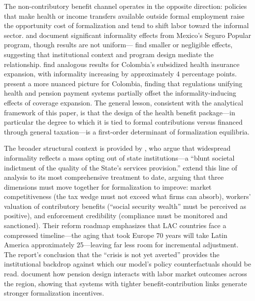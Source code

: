 \documentclass[12pt,a4paper]{article}
\begin{document}
The non-contributory benefit channel operates in the opposite direction: policies that make health or income transfers available outside formal employment raise the opportunity cost of formalization and tend to shift labor toward the informal sector. \citet{BoschCampos2014} and \citet{AteridoEtAl2011} document significant informality effects from Mexico's Seguro Popular program, though results are not uniform---\citet{AzuaraMarinescu2013} find smaller or negligible effects, suggesting that institutional context and program design mediate the relationship. \citet{CamachoConoverHoyos2013} find analogous results for Colombia's subsidized health insurance expansion, with informality increasing by approximately 4 percentage points. \citet{CalderonMarinescu2012} present a more nuanced picture for Colombia, finding that regulations unifying health and pension payment systems partially offset the informality-inducing effects of coverage expansion. The general lesson, consistent with the analytical framework of this paper, is that the design of the health benefit package---in particular the degree to which it is tied to formal contributions versus financed through general taxation---is a first-order determinant of formalization equilibria.

The broader structural context is provided by \citet{PerryEtAl2007}, who argue that widespread informality reflects a mass opting out of state institutions---a ``blunt societal indictment of the quality of the State's services provision.'' \citet{WorldBankInformalizing2025} extend this line of analysis to its most comprehensive treatment to date, arguing that three dimensions must move together for formalization to improve: market competitiveness (the tax wedge must not exceed what firms can absorb), workers' valuation of contributory benefits (``social security wealth'' must be perceived as positive), and enforcement credibility (compliance must be monitored and sanctioned). Their reform roadmap emphasizes that LAC countries face a compressed timeline---the aging that took Europe 70 years will take Latin America approximately 25---leaving far less room for incremental adjustment. The report's conclusion that the ``crisis is not yet averted'' provides the institutional backdrop against which our model's policy counterfactuals should be read. \citet{BoschMelguizoPages2013} document how pension design interacts with labor market outcomes across the region, showing that systems with tighter benefit-contribution links generate stronger formalization incentives.
\end{document}
